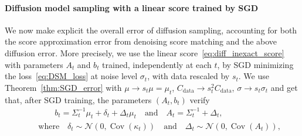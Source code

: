 \documentclass[11pt]{article}
\newcommand{\eqdef}{\coloneqq}
\newcommand{\id}{\operatorname{Id}}
\newcommand{\EE}{\mathbb{E}}
\newcommand{\cov}{\operatorname{Cov}}
\begin{document}
\paragraph{Diffusion model sampling with a linear score trained by SGD} We now make explicit the overall error of diffusion sampling, accounting for both the score approximation error from denoising score matching and the above diffusion error. More precisely, we use the linear score~\eqref{eq:diff_inexact_score} with parameters \( A_t \) and \( b_t \) trained, independently at each $t$, by SGD minimizing the loss~\eqref{eq:DSM_loss} at noise level \( \sigma_t \), with data rescaled by $s_t$. 
We use Theorem~\ref{thm:SGD_error} with $\mu \to s_t \mu = \mu_t$, $C_{\mathrm{data}} \to s_t^2 C_{\mathrm{data}}$, $\sigma \to s_t \sigma_t$ and get that, after SGD training, the parameters $(A_t, b_t)$ verify
\begin{equation*}
\begin{split}
    & \quad  \quad  \quad b_t = \Sigma_t^{-1}\mu_t + \delta_t + \Delta_t \mu_t \quad\text{and}\quad A_t = \Sigma_t^{-1} + \Delta_t, \\ 
    & \quad\text{where}\quad \delta_t \sim \mathcal{N}(0, \cov(\kappa_t)) \quad\text{and}\quad \Delta_t \sim \mathcal{N}(0, \cov(A_t)),
\end{split}
\end{equation*}
\end{document}
